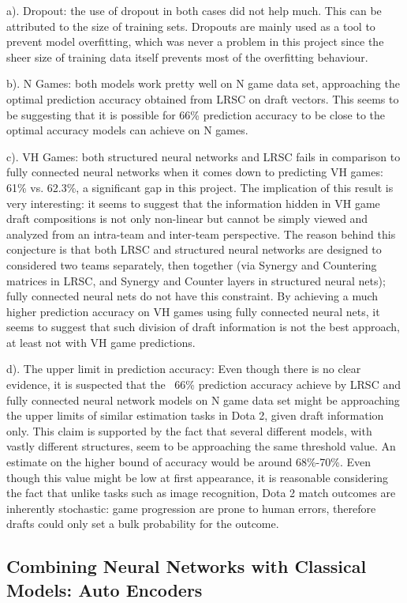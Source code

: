 \documentclass{article}
\begin{document}
a). Dropout: the use of dropout in both cases did not help much. This can be attributed to the size of training sets. Dropouts are mainly used as a tool to prevent model overfitting, which was never a problem in this project since the sheer size of training data itself prevents most of the overfitting behaviour.

b). N Games: both models work pretty well on N game data set, approaching the optimal prediction accuracy obtained from LRSC on draft vectors. This seems to be suggesting that it is possible for 66\% prediction accuracy to be close to the optimal accuracy models can achieve on N games.

c). VH Games: both structured neural networks and LRSC fails in comparison to fully connected neural networks when it comes down to predicting VH games: 61\% vs. 62.3\%, a significant gap in this project. The implication of this result is very interesting: it seems to suggest that the information hidden in VH game draft compositions is not only non-linear but cannot be simply viewed and analyzed from an intra-team and inter-team perspective. The reason behind this conjecture is that both LRSC and structured neural networks are designed to considered two teams separately, then together (via Synergy and Countering matrices in LRSC, and Synergy and Counter layers in structured neural nets); fully connected neural nets do not have this constraint. By achieving a much higher prediction accuracy on VH games using fully connected neural nets, it seems to suggest that such division of draft information is not the best approach, at least not with VH game predictions.

d). The upper limit in prediction accuracy: Even though there is no clear evidence, it is suspected that the ~66\% prediction accuracy achieve by LRSC and fully connected neural network models on N game data set might be approaching the upper limits of similar estimation tasks in Dota 2, given draft information only. This claim is supported by the fact that several different models, with vastly different structures, seem to be approaching the same threshold value. An estimate on the higher bound of accuracy would be around 68\%-70\%. Even though this value might be low at first appearance, it is reasonable considering the fact that unlike tasks such as image recognition, Dota 2 match outcomes are inherently stochastic: game progression are prone to human errors, therefore drafts could only set a bulk probability for the outcome. 


\subsection{Combining Neural Networks with Classical Models: Auto Encoders}
\end{document}
